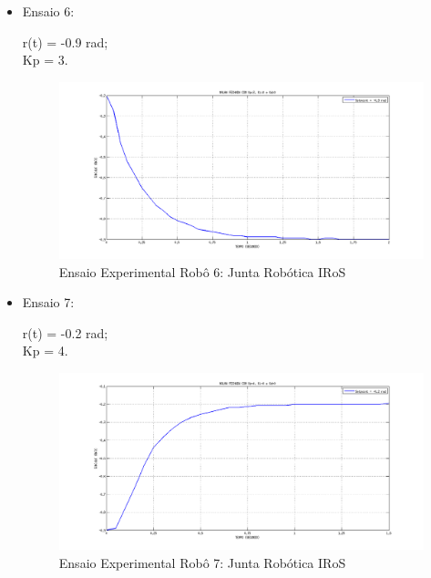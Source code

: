 \documentclass[12pt,oneside,a4paper, chapter=TITLE, section = TITLE, english, brazil]{abntex2}
\begin{document}
\begin{itemize}
\item Ensaio 6:


r(t) = -0.9 rad;\\
Kp = 3.\\

\begin{figure}[h] %
\centering
\includegraphics[scale=0.42]{./imagens/Ensaio3_2_robo}
\caption[Ensaio Experimental Robô 6: Junta Robótica IRoS]{Ensaio Experimental Robô 6: Junta Robótica IRoS}
\label{fig:ensaio3_2_robo}
\end{figure}


\item Ensaio 7:


r(t) = -0.2 rad;\\
Kp = 4.\\

\begin{figure}[h] %
\centering
\includegraphics[scale=0.43]{./imagens/Ensaio4_1_robo}
\caption[Ensaio Experimental Robô 7: Junta Robótica IRoS]{Ensaio Experimental Robô 7: Junta Robótica IRoS}
\label{fig:ensaio4_1_robo}
\end{figure}



\end{itemize}
\end{document}
